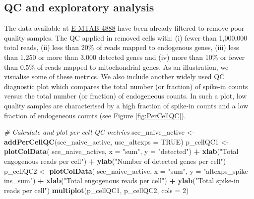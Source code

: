 \documentclass[9pt,a4paper,]{extarticle}
\newenvironment{Shaded}{\begin{snugshade}}{\end{snugshade}}
\newcommand{\CommentTok}[1]{\textcolor[rgb]{0.56,0.35,0.01}{\textit{#1}}}
\newcommand{\DataTypeTok}[1]{\textcolor[rgb]{0.13,0.29,0.53}{#1}}
\newcommand{\DecValTok}[1]{\textcolor[rgb]{0.00,0.00,0.81}{#1}}
\newcommand{\KeywordTok}[1]{\textcolor[rgb]{0.13,0.29,0.53}{\textbf{#1}}}
\newcommand{\NormalTok}[1]{#1}
\newcommand{\OperatorTok}[1]{\textcolor[rgb]{0.81,0.36,0.00}{\textbf{#1}}}
\newcommand{\OtherTok}[1]{\textcolor[rgb]{0.56,0.35,0.01}{#1}}
\newcommand{\StringTok}[1]{\textcolor[rgb]{0.31,0.60,0.02}{#1}}
\begin{document}
\hypertarget{qc-and-exploratory-analysis}{%
\subsection{QC and exploratory analysis}\label{qc-and-exploratory-analysis}}

The data available at
\href{https://www.ebi.ac.uk/arrayexpress/experiments/E-MTAB-4888/}{E-MTAB-4888} have
been already filtered to remove poor quality samples.
The QC applied in \citep{Martinez-jimenez2017} removed cells with: (i) fewer
than 1,000,000 total reads, (ii) less than 20\% of reads mapped to
endogenous genes, (iii) less than 1,250 or more than 3,000 detected genes and
(iv) more than 10\% or fewer than 0.5\% of reads mapped to mitochondrial genes.
As an illustration, we visualise some of these metrics.
We also include another widely used QC diagnostic plot which compares the total
number (or fraction) of spike-in counts versus the total number (or fraction) of
endogeneous counts.
In such a plot, low quality samples are characterised by a high fraction of
spike-in counts and a low fraction of endogeneous counts
(see Figure \ref{fig:PerCellQC}).

\begin{Shaded}
\begin{Highlighting}[]
\CommentTok{# Calculate and plot per cell QC metrics}
\NormalTok{sce_naive_active <-}\StringTok{ }\KeywordTok{addPerCellQC}\NormalTok{(sce_naive_active, }\DataTypeTok{use_altexps =} \OtherTok{TRUE}\NormalTok{)}
\NormalTok{p_cellQC1 <-}\StringTok{ }\KeywordTok{plotColData}\NormalTok{(}
\NormalTok{  sce_naive_active, }
  \DataTypeTok{x =} \StringTok{"sum"}\NormalTok{, }
  \DataTypeTok{y =} \StringTok{"detected"}\NormalTok{) }\OperatorTok{+}
\StringTok{  }\KeywordTok{xlab}\NormalTok{(}\StringTok{"Total engogenous reads per cell"}\NormalTok{) }\OperatorTok{+}
\StringTok{  }\KeywordTok{ylab}\NormalTok{(}\StringTok{"Number of detected genes per cell"}\NormalTok{)}
\NormalTok{p_cellQC2 <-}\StringTok{ }\KeywordTok{plotColData}\NormalTok{(}
\NormalTok{  sce_naive_active, }
  \DataTypeTok{x =} \StringTok{"sum"}\NormalTok{, }
  \DataTypeTok{y =} \StringTok{"altexps_spike-ins_sum"}\NormalTok{) }\OperatorTok{+}
\StringTok{  }\KeywordTok{xlab}\NormalTok{(}\StringTok{"Total engogenous reads per cell"}\NormalTok{) }\OperatorTok{+}
\StringTok{  }\KeywordTok{ylab}\NormalTok{(}\StringTok{"Total spike-in reads per cell"}\NormalTok{)}
\KeywordTok{multiplot}\NormalTok{(p_cellQC1, p_cellQC2, }\DataTypeTok{cols =} \DecValTok{2}\NormalTok{)}
\end{Highlighting}
\end{Shaded}
\end{document}

